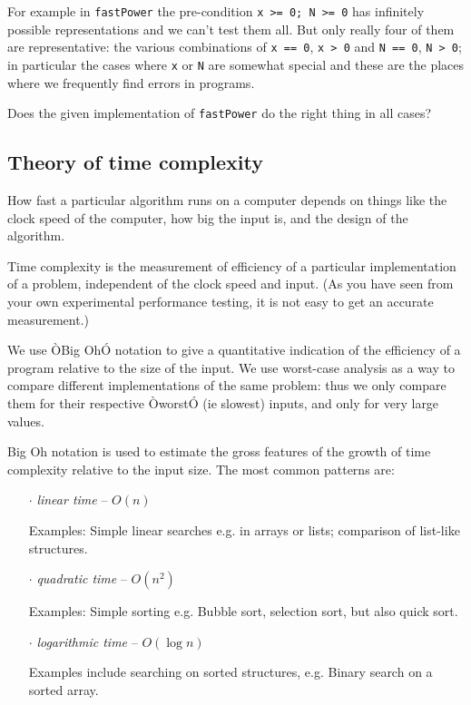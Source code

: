 \documentclass[twoside=false,DIV=14]{scrartcl}
\begin{document}
\begin{itemize}
For example in {\tt fastPower} the pre-condition {\tt  x >= 0; N >= 0} has infinitely possible representations and we can't test them all.  But only really four of them are representative: the various combinations of  {\tt x == 0}, {\tt x > 0} and  {\tt N == 0}, {\tt N > 0}; in particular the cases where {\tt x} or {\tt N} are somewhat special and these are the places where we frequently find errors in programs.

Does the given implementation of {\tt fastPower} do the right thing in all cases?

\subsection*{Theory of time complexity}

How fast a particular algorithm runs on a computer depends on things like the clock speed of the computer, how big the input is, and the design of the algorithm.  

Time complexity is the measurement of efficiency of a particular implementation of a problem, independent of the clock speed and input.  (As you have seen from your own experimental performance testing, it is not easy to get an accurate measurement.)

We use ÒBig OhÓ notation to give a quantitative indication of the efficiency of a program relative to the size of the input.  We use worst-case analysis as a way to compare  different implementations of the same problem: thus we only compare them for their respective ÒworstÓ (ie slowest) inputs, and only for very large values.

Big Oh notation is used to estimate the gross features of the growth of time complexity relative to the input size. The most common patterns are:

\begin{itemize}
\item [$\cdot$]  \emph{linear time}  -- $O(n)$ 

Examples: Simple linear searches e.g. in arrays or lists; comparison of list-like structures.

\item [$\cdot$]   \emph{quadratic time}  -- $O(n^2)$

Examples: Simple sorting e.g. Bubble sort, selection sort, but also quick sort.

\item [$\cdot$]  \emph{logarithmic time}  -- $O(\log n)$

Examples include searching on sorted structures, e.g. Binary search on a sorted array.


\end{itemize}
\end{itemize}
\end{document}

